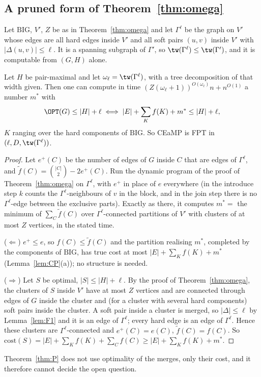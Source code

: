 \subsection{A pruned form of Theorem~\ref{thm:omega}}
Let $\mathrm{BIG}$, $V'$, $Z$ be as in Theorem~\ref{thm:omega} and let $\Gamma^\ell$ be the graph on $V'$ whose edges are all hard edges inside $V'$ and all soft pairs $(u,v)$ inside $V'$ with $|\Delta(u,v)|\le\ell$. It is a spanning subgraph of $\Gamma'$, so $\tw(\Gamma^\ell)\le\tw(\Gamma')$, and it is computable from $(G,H)$ alone.
\begin{theorem}\label{thm:P}
Let $H$ be pair-maximal and let $\omega_\ell=\tw(\Gamma^\ell)$, with a tree decomposition of that width given. Then one can compute in time $(Z(\omega_\ell+1))^{O(\omega_\ell)}n+n^{O(1)}$ a number $m^*$ with
\[
\OPT(G)\le|H|+\ell\iff|E|+\sum_Kf(K)+m^*\le|H|+\ell ,
\]
$K$ ranging over the hard components of $\mathrm{BIG}$. So CEaMP is FPT in $(\ell,D,\tw(\Gamma^\ell))$.
\end{theorem}
\begin{proof}
Let $e^+(C)$ be the number of edges of $G$ inside $C$ that are edges of $\Gamma^\ell$, and $\tilde f(C)=\binom{|C|}2-2e^+(C)$. Run the dynamic program of the proof of Theorem~\ref{thm:omega} on $\Gamma^\ell$, with $e^+$ in place of $e$ everywhere (in the introduce step $k$ counts the $\Gamma^\ell$-neighbours of $v$ in the block, and in the join step there is no $\Gamma^\ell$-edge between the exclusive parts). Exactly as there, it computes $m^*=$ the minimum of $\sum_C\tilde f(C)$ over $\Gamma^\ell$-connected partitions of $V'$ with clusters of at most $Z$ vertices, in the stated time.

($\Leftarrow$) $e^+\le e$, so $f(C)\le\tilde f(C)$ and the partition realising $m^*$, completed by the components of $\mathrm{BIG}$, has true cost at most $|E|+\sum_Kf(K)+m^*$ (Lemma~\ref{lem:CP}(a)); no structure is needed.

($\Rightarrow$) Let $S$ be optimal, $|S|\le|H|+\ell$. By the proof of Theorem~\ref{thm:omega}, the clusters of $S$ inside $V'$ have at most $Z$ vertices and are connected through edges of $G$ inside the cluster and (for a cluster with several hard components) soft pairs inside the cluster. A soft pair inside a cluster is merged, so $|\Delta|\le\ell$ by Lemma~\ref{lem:F1} and it is an edge of $\Gamma^\ell$; every hard edge is an edge of $\Gamma^\ell$. Hence these clusters are $\Gamma^\ell$-connected and $e^+(C)=e(C)$, $\tilde f(C)=f(C)$. So $\mathrm{cost}(S)=|E|+\sum_Kf(K)+\sum_Cf(C)\ge|E|+\sum_Kf(K)+m^*$.
\end{proof}
Theorem~\ref{thm:P} does not use optimality of the merges, only their cost, and it therefore cannot decide the open question.


